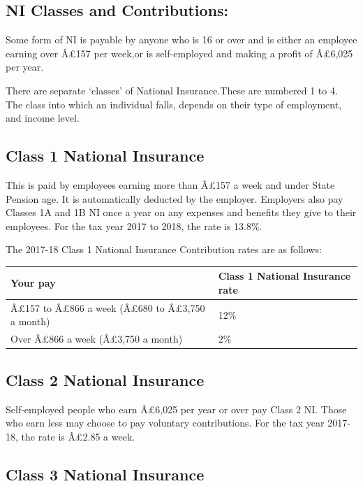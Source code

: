 \documentclass[]{tufte-handout}
\begin{document}
\hypertarget{ni-classes-and-contributions}{%
\subsection{NI Classes and
Contributions:}\label{ni-classes-and-contributions}}

Some form of NI is payable by anyone who is 16 or over and is either an
employee earning over Â£157 per week,or is self-employed and making a
profit of Â£6,025 per year.

There are separate `classes' of National Insurance.These are numbered 1
to 4. The class into which an individual falls, depends on their type of
employment, and income level.

\hypertarget{class-1-national-insurance}{%
\subsection{Class 1 National
Insurance}\label{class-1-national-insurance}}

This is paid by employees earning more than Â£157 a week and under State
Pension age. It is automatically deducted by the employer. Employers
also pay Classes 1A and 1B NI once a year on any expenses and benefits
they give to their employees. For the tax year 2017 to 2018, the rate is
13.8\%.

The 2017-18 Class 1 National Insurance Contribution rates are as
follows:

\begin{longtable}[]{@{}ll@{}}
\toprule
Your pay & Class 1 National Insurance rate\tabularnewline
\midrule
\endhead
Â£157 to Â£866 a week (Â£680 to Â£3,750 a month) & 12\%\tabularnewline
Over Â£866 a week (Â£3,750 a month) & 2\%\tabularnewline
\bottomrule
\end{longtable}

\hypertarget{class-2-national-insurance}{%
\subsection{Class 2 National
Insurance}\label{class-2-national-insurance}}

Self-employed people who earn Â£6,025 per year or over pay Class 2 NI.
Those who earn less may choose to pay voluntary contributions. For the
tax year 2017-18, the rate is Â£2.85 a week.

\hypertarget{class-3-national-insurance}{%
\subsection{Class 3 National
Insurance}\label{class-3-national-insurance}}
\end{document}
